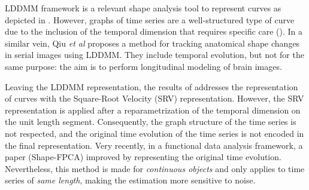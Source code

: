      LDDMM framework is a relevant shape analysis tool to represent curves as depicted in \cite{glaunes2008large}. However, graphs of time series are a well-structured type of curve due to the inclusion of the temporal dimension that requires specific care ().
     In a similar vein, Qiu \textit{et al} \cite{qiu2009time} proposes a method for tracking anatomical shape changes in serial images using LDDMM. They include temporal evolution, but not for the same purpose: the aim is to perform longitudinal modeling of brain images.

       Leaving the LDDMM representation, the results of \cite{srivastava2010shape,heo2024logistic} addresses the representation of curves with the Square-Root Velocity (SRV) representation.
        However, the SRV representation is applied after a reparametrization of the temporal dimension on the unit length segment.
         Consequently, the graph structure of the time series is not respected, and the original time evolution of the time series is not encoded in the final representation.
          Very recently, in a functional data analysis framework, a paper \cite{wu2024shape} (Shape-FPCA) improved by representing the original time evolution.
           Nevertheless, this method is made for \textit{continuous objects} and only applies to time series of \textit{same length}, making the estimation more sensitive to noise.
